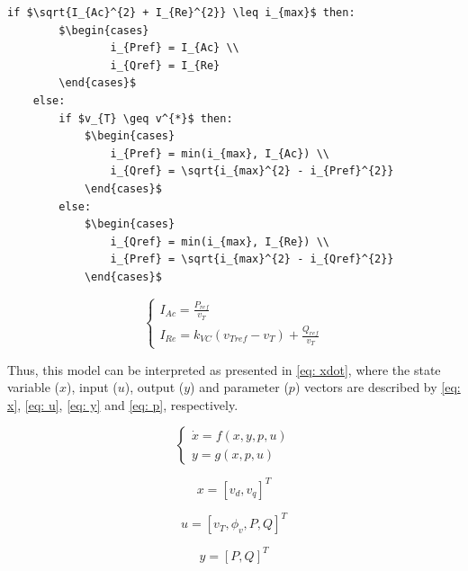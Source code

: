 \begin{center}
	\begin{lstlisting}[mathescape, columns=fullflexible]
	if $\sqrt{I_{Ac}^{2} + I_{Re}^{2}} \leq i_{max}$ then:
		$\begin{cases}
				i_{Pref} = I_{Ac} \\
				i_{Qref} = I_{Re}
		\end{cases}$
	else:
		if $v_{T} \geq v^{*}$ then:	
			$\begin{cases}
				i_{Pref} = min(i_{max}, I_{Ac}) \\
				i_{Qref} = \sqrt{i_{max}^{2} - i_{Pref}^{2}}
			\end{cases}$
		else:
			$\begin{cases}
				i_{Qref} = min(i_{max}, I_{Re}) \\
				i_{Pref} = \sqrt{i_{max}^{2} - i_{Qref}^{2}}
			\end{cases}$
	\end{lstlisting}
\end{center}

\begin{equation*}
	\begin{cases}
		I_{Ac} = \frac{P_{ref}}{v_{T}} \\
		I_{Re} = k_{VC}(v_{Tref} - v_{T}) + \frac{Q_{ref}}{v_{T}}
	\end{cases}
\end{equation*}

Thus, this model can be interpreted as presented in \eqref{eq: xdot}, where the state variable ($x$), input ($u$), output ($y$) and parameter ($p$) vectors are described by \eqref{eq: x}, \eqref{eq: u}, \eqref{eq: y} and \eqref{eq: p}, respectively.

\begin{equation}
	\begin{cases}
		\dot{x} = f(x, y, p, u) \\
		y = g(x, p, u)
	\end{cases}
	\label{eq: xdot}
\end{equation}

\begin{equation}
	x = [v_{d}, v_{q}]^T
	\label{eq: x}
\end{equation}

\begin{equation}
	u = [v_{T}, \phi_{v}, P, Q]^T
	\label{eq: u}
\end{equation}

\begin{equation}
	y = [P, Q]^T
	\label{eq: y}
\end{equation}

